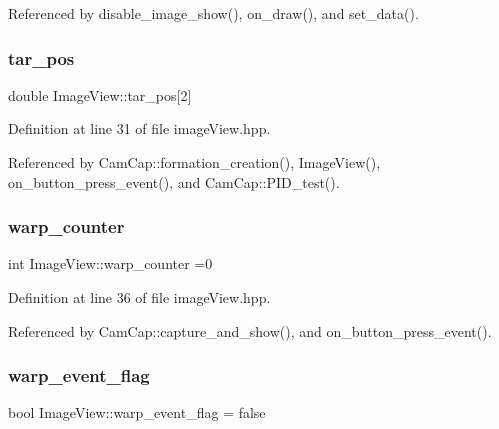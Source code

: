 Referenced by disable\+\_\+image\+\_\+show(), on\+\_\+draw(), and set\+\_\+data().

\mbox{\label{class_image_view_a569238a3b9d094c11637673dba40bf29}} 
\subsubsection{\texorpdfstring{tar\+\_\+pos}{tar\_pos}}
{\footnotesize\ttfamily double Image\+View\+::tar\+\_\+pos\mbox{[}2\mbox{]}}



Definition at line 31 of file image\+View.\+hpp.



Referenced by Cam\+Cap\+::formation\+\_\+creation(), Image\+View(), on\+\_\+button\+\_\+press\+\_\+event(), and Cam\+Cap\+::\+P\+I\+D\+\_\+test().

\mbox{\label{class_image_view_af8b73549a44458562570771774f7b04b}} 
\subsubsection{\texorpdfstring{warp\+\_\+counter}{warp\_counter}}
{\footnotesize\ttfamily int Image\+View\+::warp\+\_\+counter =0}



Definition at line 36 of file image\+View.\+hpp.



Referenced by Cam\+Cap\+::capture\+\_\+and\+\_\+show(), and on\+\_\+button\+\_\+press\+\_\+event().

\mbox{\label{class_image_view_a1a2a3e02d28b64343e62e17069fb1fd8}} 
\subsubsection{\texorpdfstring{warp\+\_\+event\+\_\+flag}{warp\_event\_flag}}
{\footnotesize\ttfamily bool Image\+View\+::warp\+\_\+event\+\_\+flag = false}



